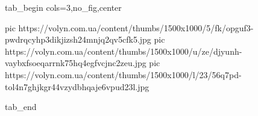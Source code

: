  
 
 
 
 


\ifcmt
  tab_begin cols=3,no_fig,center

     pic https://volyn.com.ua/content/thumbs/1500x1000/5/fk/opguf3-pwdrqcyhp3dikjizsh24mnjq2qv5cfk5.jpg
		 pic https://volyn.com.ua/content/thumbs/1500x1000/u/ze/djyunh-vaybxfsoeqarrnk75hq4egfvcjnc2zeu.jpg
		 pic https://volyn.com.ua/content/thumbs/1500x1000/l/23/56q7pd-tol4n7ghjkgr44vzydbhqaje6vpud23l.jpg

  tab_end
\fi
